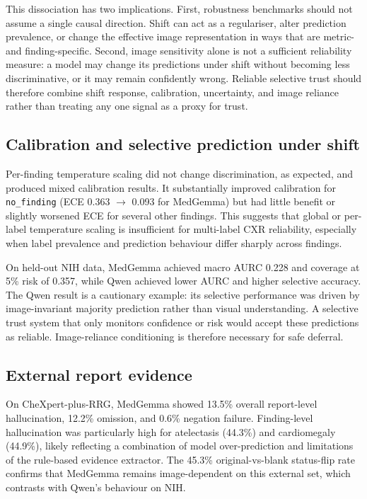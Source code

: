 This dissociation has two implications. First, robustness benchmarks should not assume a single causal direction. Shift can act as a regulariser, alter prediction prevalence, or change the effective image representation in ways that are metric- and finding-specific. Second, image sensitivity alone is not a sufficient reliability measure: a model may change its predictions under shift without becoming less discriminative, or it may remain confidently wrong. Reliable selective trust should therefore combine shift response, calibration, uncertainty, and image reliance rather than treating any one signal as a proxy for trust.

\subsection{Calibration and selective prediction under shift}

Per-finding temperature scaling did not change discrimination, as expected, and produced mixed calibration results. It substantially improved calibration for \texttt{no\_finding} (ECE 0.363 $\rightarrow$ 0.093 for MedGemma) but had little benefit or slightly worsened ECE for several other findings. This suggests that global or per-label temperature scaling is insufficient for multi-label CXR reliability, especially when label prevalence and prediction behaviour differ sharply across findings.

On held-out NIH data, MedGemma achieved macro AURC 0.228 and coverage at 5\% risk of 0.357, while Qwen achieved lower AURC and higher selective accuracy. The Qwen result is a cautionary example: its selective performance was driven by image-invariant majority prediction rather than visual understanding. A selective trust system that only monitors confidence or risk would accept these predictions as reliable. Image-reliance conditioning is therefore necessary for safe deferral.

\subsection{External report evidence}

On CheXpert-plus-RRG, MedGemma showed 13.5\% overall report-level hallucination, 12.2\% omission, and 0.6\% negation failure. Finding-level hallucination was particularly high for atelectasis (44.3\%) and cardiomegaly (44.9\%), likely reflecting a combination of model over-prediction and limitations of the rule-based evidence extractor. The 45.3\% original-vs-blank status-flip rate confirms that MedGemma remains image-dependent on this external set, which contrasts with Qwen’s behaviour on NIH.

